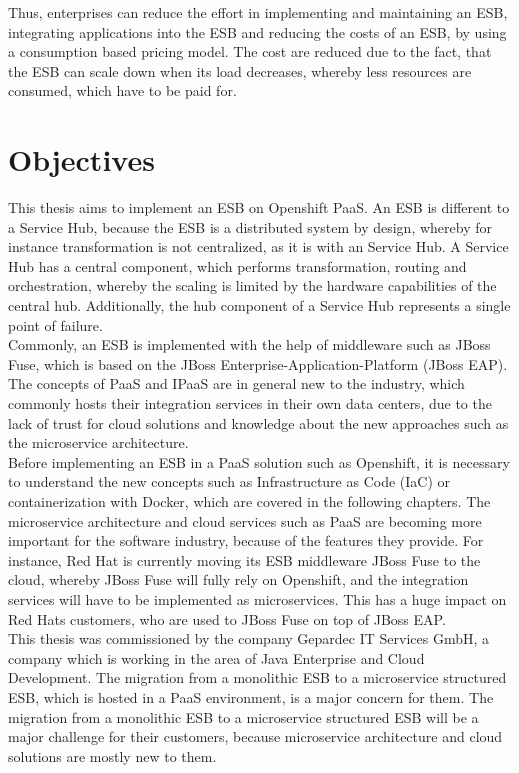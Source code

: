 Thus, enterprises can reduce the effort in implementing and maintaining an ESB, integrating applications into the ESB and reducing the costs of an ESB, by using a consumption based pricing model. The cost are reduced due to the fact, that the ESB can scale down when its load decreases, whereby less resources are consumed, which have to be paid for.

\section{Objectives}
\label{sec:intro-objectives}
This thesis aims to implement an ESB on Openshift PaaS. An ESB is different to a Service Hub, because the ESB is a distributed system by design, whereby for instance transformation is not centralized, as it is with an Service Hub. A Service Hub has a central component, which performs transformation, routing and orchestration, whereby the scaling is limited by the hardware capabilities of the central hub. Additionally, the hub component of a Service Hub represents a single point of failure\cite{EIP}. \\

Commonly, an ESB is implemented with the help of middleware such as JBoss Fuse, which is based on the JBoss Enterprise-Application-Platform (JBoss EAP). The concepts of PaaS and IPaaS are in general new to the industry, which commonly hosts their integration services in their own data centers, due to the lack of trust for cloud solutions and knowledge about the new approaches such as the microservice architecture\cite{Openshift2018}. \\

Before implementing an ESB in a PaaS solution such as Openshift, it is necessary to understand the new concepts such as Infrastructure as Code (IaC) or containerization with Docker, which are covered in the following chapters. The microservice architecture and cloud services such as PaaS are becoming more important for the software industry, because of the features they provide. For instance, Red Hat is currently moving its ESB middleware JBoss Fuse to the cloud, whereby JBoss Fuse will fully rely on Openshift, and the integration services will have to be implemented as microservices. This has a huge impact on Red Hats customers, who are used to JBoss Fuse on top of JBoss EAP. \\

This thesis was commissioned by the company Gepardec IT Services GmbH, a company which is working in the area of Java Enterprise and Cloud Development. The migration from a monolithic ESB to a microservice structured ESB, which is hosted in a PaaS environment, is a major concern for them. The migration from a monolithic ESB to a microservice structured ESB will be a major challenge for their customers, because microservice architecture and cloud solutions are mostly new to them.  \\

